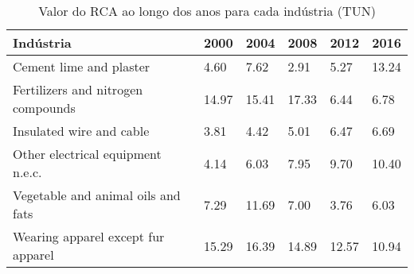 \begin{table}
\centering
\caption{Valor do RCA ao longo dos anos para cada indústria (TUN)}
\label{tab:ex3-tempo-TUN}
\begin{tabular}{p{6cm}p{1.5cm}p{1.5cm}p{1.5cm}p{1.5cm}p{1.5cm}}
\toprule
                         Indústria &  2000 &  2004 &  2008 &  2012 &  2016 \\
\midrule
           Cement lime and plaster &  4.60 &  7.62 &  2.91 &  5.27 & 13.24 \\
Fertilizers and nitrogen compounds & 14.97 & 15.41 & 17.33 &  6.44 &  6.78 \\
          Insulated wire and cable &  3.81 &  4.42 &  5.01 &  6.47 &  6.69 \\
 Other electrical equipment n.e.c. &  4.14 &  6.03 &  7.95 &  9.70 & 10.40 \\
Vegetable and animal oils and fats &  7.29 & 11.69 &  7.00 &  3.76 &  6.03 \\
Wearing apparel except fur apparel & 15.29 & 16.39 & 14.89 & 12.57 & 10.94 \\
\bottomrule
\end{tabular}
\end{table}
